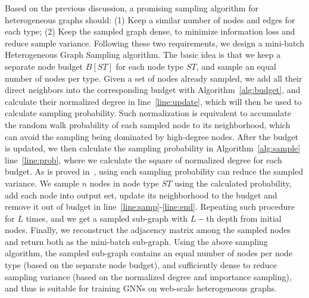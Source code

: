 \documentclass[sigconf]{acmart}
\theoremstyle{definition}
\begin{document}
{Based on the previous discussion, a promising sampling algorithm for heterogeneous graphs should: (1) Keep a similar number of nodes and edges for each type; (2) Keep the sampled graph dense, to minimize information loss and reduce sample variance. Following these two requirements, we design a mini-batch Heterogeneous Graph Sampling algorithm. The basic idea is that we keep a separate node budget $B[ST]$ for each node type $ST$, and sample an equal number of nodes per type. Given a set of nodes already sampled, we add all their direct neighbors into the corresponding budget with Algorithm~\ref{alg:budget}, and calculate their normalized degree in line~\ref{line:update}, which will then be used to calculate sampling probability. Such normalization is equivalent to accumulate the random walk probability of each sampled node to its neighborhood, which can avoid the sampling being dominated by high-degree nodes. After the budget is updated, we then calculate the sampling probability in Algorithm~\ref{alg:sample} line~\ref{line:prob}, where we calculate the square of normalized degree for each budget. As is proved in~\cite{fastgcn, ladies}, using such sampling probability can reduce the sampled variance. We sample $n$ nodes in node type $ST$ using the calculated probability, add each node into output set, update its neighborhood to the budget and remove it out of budget in line~\ref{line:samp}-\ref{line:end}. Repeating such procedure for $L$ times, and we get a sampled sub-graph with $L-$th depth from initial nodes. Finally, we reconstruct the adjacency matrix among the sampled nodes and return both as the mini-batch sub-graph. Using the above sampling algorithm, the sampled sub-graph contains an equal number of nodes per node type (based on the separate node budget), and sufficiently dense to reduce sampling variance (based on the normalized degree and importance sampling), and thus is suitable for training GNNs on web-scale heterogeneous graphs.

}
\end{document}
